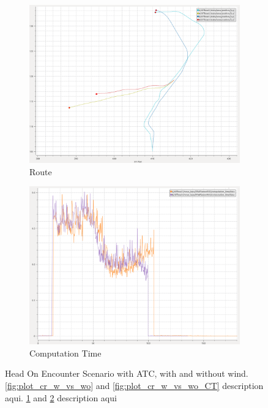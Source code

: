 \begin{figure}[H]
            \begin{subfigure}[b]{0.45\textwidth}
                \centering
                \includegraphics[width=\textwidth]{figs/Chap5/plot_cr_w_vs_wind.png}
                \caption{Route}
                \label{fig:plot_cr_w_vs_wind}
            \end{subfigure}
            \begin{subfigure}[b]{0.45\textwidth}
                \centering
                \includegraphics[width=\textwidth]{figs/Chap5/plot_cr_w_vs_wind_CT.png}
                \caption{Computation Time}
                \label{fig:plot_cr_w_vs_wind_CT}
            \end{subfigure}
        
        \caption{Head On Encounter Scenario with ATC, with and without wind. \ref{fig:plot_cr_w_vs_wo} and \ref{fig:plot_cr_w_vs_wo_CT}  description aqui. \ref{fig:plot_cr_w_vs_wind} and \ref{fig:plot_cr_w_vs_wind_CT} description aqui}
        \label{fig:plots_cr}
        \end{figure}
        
